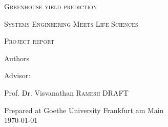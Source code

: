 \documentclass[a4paper,12pt]{article}
\begin{document}
\setlength\parindent{0pt}
\begin{titlepage}
	\centering
	\vspace{5cm}
	{\scshape\LARGE Greenhouse yield prediction \par}
	\vspace{0.5cm}
	{\scshape Systems Engineering Meets Life Sciences \par}
	{\scshape Project report\par}
	\vspace{2cm}
	{\large Authors\par}
	\vspace{0.5cm}
	

	\vfill
	Advisor:\par
	Prof. Dr. Visvanathan  \textsc{Ramesh}
	\vfill
	\huge
	DRAFT
	\vfill

	{\large Prepared at Goethe University Frankfurt am Main \\ \today\par}
\end{titlepage}

\tableofcontents
\newpage
{}







\newpage

\newpage





\newpage

%


%




\newpage
\printbibliography
\end{document}
